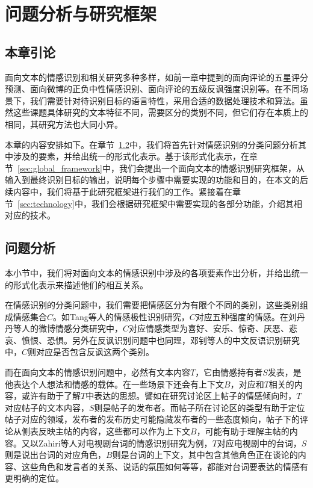 \chapter{问题分析与研究框架}
\label{cha:problem_framework}

\section{本章引论}

面向文本的情感识别和相关研究多种多样，如前一章中提到的面向评论的五星评分预测、面向微博的正负中性情感识别、面向评论的五级反讽强度识别等。在不同场景下，我们需要针对待识别目标的语言特性，采用合适的数据处理技术和算法。虽然这些课题具体研究的文本特征不同，需要区分的类别不同，但它们存在本质上的相同，其研究方法也大同小异。

本章的内容安排如下。在章节~\ref{sec:global_problem_analysis}中，我们将首先针对情感识别的分类问题分析其中涉及的要素，并给出统一的形式化表示。基于该形式化表示，在章节~\ref{sec:global_framework}中，我们会提出一个面向文本的情感识别研究框架，从输入到最终识别目标的输出，说明每个步骤中需要实现的功能和目的，在本文的后续内容中，我们将基于此研究框架进行我们的工作。紧接着在章节~\ref{sec:technology}中，我们会根据研究框架中需要实现的各部分功能，介绍其相对应的技术。

\section{问题分析}
\label{sec:global_problem_analysis}

本小节中，我们将对面向文本的情感识别中涉及的各项要素作出分析，并给出统一的形式化表示来描述他们的相互关系。

在情感识别的分类问题中，我们需要把情感区分为有限个不同的类别，这些类别组成情感集合$C$。如Tang等人\cite{tang2015learning}的情感极性识别研究，$C$对应五种强度的情感。在刘丹丹等人\cite{刘丹丹2015基于}的微博情感分类研究中，$C$对应情感类型为喜好、安乐、惊奇、厌恶、悲哀、愤恨、恐惧。另外在反讽识别问题中也同理，邓钊等人\cite{2015面向微博的中文反语识别研究}的中文反语识别研究中，$C$则对应是否包含反讽这两个类别。

而在面向文本的情感识别问题中，必然有文本内容$T$，它由情感持有者$S$发表，是他表达个人想法和情感的载体。在一些场景下还会有上下文$B$，对应和$T$相关的内容，或许有助于了解$T$中表达的思想。譬如在研究讨论区上帖子的情感倾向时，$T$对应帖子的文本内容，$S$则是帖子的发布者。而帖子所在讨论区的类型有助于定位帖子对应的领域，发布者的发布历史可能隐藏发布者的一些态度倾向，帖子下的评论从侧表反映主帖的内容，这些都可以作为上下文$B$，可能有助于理解主帖的内容。又以Zahiri等人\cite{Zahiri2017Emotion}对电视剧台词的情感识别研究为例，$T$对应电视剧中的台词，$S$则是说出台词的对应角色，$B$则是台词的上下文，其中包含其他角色正在谈论的内容、这些角色和发言者的关系、说话的氛围如何等等，都能对台词要表达的情感有更明确的定位。

